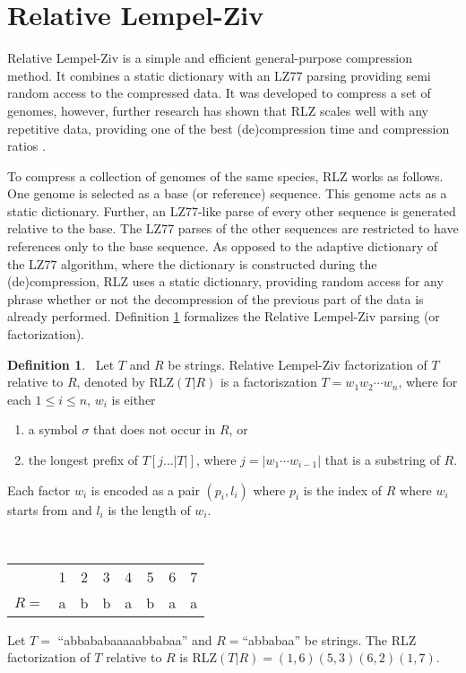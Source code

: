 \documentclass[english,twoside,censored,csm,algorithms-track-2020]{HYthesisML}
\theoremstyle{plain}
\theoremstyle{definition}
\newtheorem{definition}[theorem]{Definition}
\begin{document}
\section{Relative Lempel-Ziv}
Relative Lempel-Ziv is a simple and efficient \citep{Deorowicz11} general-purpose \citep{Hoobin11}
compression method. It combines a static dictionary with an LZ77 parsing providing semi random
access to the compressed data. It was developed to compress a set of genomes, however, further
research has shown that RLZ scales well with any repetitive data, providing
one of the best (de)compression time and compression ratios \citep{Gagie16}.

To compress a collection of genomes of the same species, RLZ works as follows. One genome is selected
as a base (or reference) sequence. This genome acts as a static dictionary. Further, an LZ77-like parse of every other sequence
is generated relative to the base. The LZ77 parses of the other sequences are restricted to have
references only to the base sequence. As opposed to the adaptive dictionary
of the LZ77 algorithm, where the dictionary is constructed during the (de)compression, RLZ uses
a static dictionary, providing random access for any phrase whether or not the decompression
of the previous part of the data is already performed. Definition \ref{def-rlz} formalizes the
Relative Lempel-Ziv parsing (or factorization).

\begin{definition}~\label{def-rlz}
  Let $T$ and $R$ be strings. Relative Lempel-Ziv factorization of $T$ relative to $R$, denoted by
  RLZ$(T|R)$ is a factoriszation $T=w_1w_2\cdots w_n$, where for each $1\leq i \leq n$, $w_i$ is either
  \begin{enumerate}[leftmargin=28pt]
  \item a symbol $\sigma$ that does not occur in $R$, or
  \item the longest prefix of $T[j...|T|]$, where $j = |w_1\cdots w_{i-1}|$ that is a substring of $R$.
  \end{enumerate}
  Each factor $w_i$ is encoded as a pair $(p_i,l_i)$ where $p_i$ is the index of $R$ where $w_i$
  starts from and $l_i$ is the length of $w_i$.
\end{definition}

\begin{testexample}
  ~\\
  \vspace{-1cm}
  \begin{center}
  \begin{tabular}[H]{r c c c c c c c}
    &1&2&3&4&5&6&7 \\
    $R=$&a&b&b&a&b&a&a \\
  \end{tabular}
  \end{center}
  Let $T=$ ``abbababaaaaabbabaa'' and $R=$``abbabaa'' be strings. The RLZ factorization of $T$
  relative to $R$ is RLZ$(T|R)=(1,6)(5,3)(6,2)(1,7)$.
\end{testexample}
\end{document}
